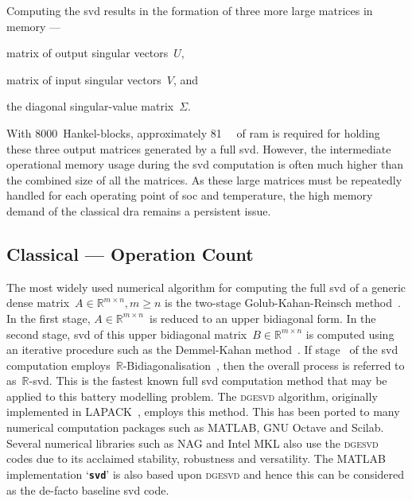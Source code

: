 Computing the \gls{svd} results in the formation of three more large matrices in
memory ---
\begin{enumerate*}[label=\roman*)]
    \item matrix   of   output  singular   vectors~$U$,
    \item matrix of  input  singular vectors~$V$, and
    \item the diagonal singular-value  matrix~$\Sigma$.
\end{enumerate*}
With  8000~Hankel-blocks,  approximately  \SI{81}{\giga\byte}  of  \gls{ram}  is
required for holding these three output  matrices generated by a full \gls{svd}.
However,  the  intermediate  operational   memory  usage  during  the  \gls{svd}
computation is often much higher than the  combined size of all the matrices. As
these large  matrices must  be repeatedly  handled for  each operating  point of
\gls{soc} and  temperature, the  high memory demand  of the  classical \gls{dra}
remains a persistent issue.

\subsection{Classical  ---  Operation Count}\label{subsec:Traditional-DRA--CPU}

The most widely  used numerical algorithm for computing the  full \gls{svd} of a
generic dense matrix~${\ensuremath{A\in\mathbb{R}^{m \times n},m\geq n}}$ is the
two-stage  Golub-Kahan-Reinsch  method~\cite{Golub2013}.  In  the  first  stage,
${A\in\mathbb{R}^{m \times n}}$~is  reduced to an upper bidiagonal  form. In the
second  stage, \gls{svd}  of  this  upper bidiagonal  matrix~${B\in\mathbb{R}^{m
\times   n}}$  is   computed  using   an   iterative  procedure   such  as   the
Demmel-Kahan method~\cite{Golub2013}. If  stage~ of the \gls{svd}
computation  employs~$\mathbb{R}$-Bidiagonalisation~\cite{Golub2013},  then  the
overall  process is  referred to  as~\mbox{$\mathbb{R}$-\gls{svd}}. This  is the
fastest known  full \gls{svd}  computation method  that may  be applied  to this
battery modelling problem. The \textsc{dgesvd} algorithm, originally implemented
in  \textsc{LAPACK}~\cite{Anderson1999},  employs  this method.  This  has  been
ported to  many numerical computation  packages such  as MATLAB, GNU  Octave and
Scilab.  Several  numerical  libraries  such  as NAG  and  Intel  MKL  also  use
the  \textsc{dgesvd}  codes  due  to its  acclaimed  stability,  robustness  and
versatility.  The MATLAB  implementation `\texttt{\textbf{svd}}'  is also  based
upon \textsc{dgesvd} and  hence this can be considered as  the de-facto baseline
\gls{svd} code.

